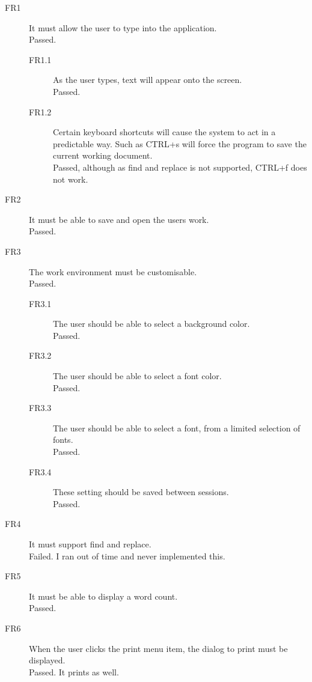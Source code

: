 \documentclass[10pt]{article}
\begin{document}
\begin{description}

   \item[FR1] It must allow the user to type into the application. \\ Passed.

   \begin{description}

      \item[FR1.1] As the user types, text will appear onto the screen. \\ Passed.

      \item[FR1.2] Certain keyboard shortcuts will cause the system to act in a predictable way. Such as CTRL+s will force the program to save the current working document. \\ Passed, although as find and replace is not supported, CTRL+f does not work.

   \end{description}

   \item[FR2] It must be able to save and open the users work. \\ Passed.

   \item[FR3] The work environment must be customisable. \\ Passed.

   \begin{description}

      \item[FR3.1] The user should be able to select a background color. \\ Passed.

      \item[FR3.2] The user should be able to select a font color. \\ Passed.

      \item[FR3.3] The user should be able to select a font, from a limited selection of fonts. \\ Passed.

      \item[FR3.4] These setting should be saved between sessions. \\ Passed.

   \end{description}

   \item[FR4] It must support find and replace. \\ Failed. I ran out of time and never implemented this.

   \item[FR5] It must be able to display a word count. \\ Passed.

   \item[FR6] When the user clicks the print menu item, the dialog to print must be displayed. \\ Passed. It prints as well.

\end{description}
\end{document}
